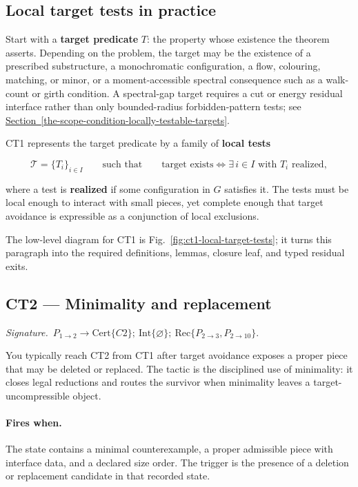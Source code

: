 \documentclass[
  11pt,
]{article}
\theoremstyle{definition}
\newcommand{\secref}[1]{\hyperref[#1]{Section~\ref*{#1}}}
\newcommand{\ctsignature}[1]{\par\noindent\emph{Signature.}\ #1\par\medskip}
\newcommand{\ctcert}[1]{\mathrm{Cert}\{#1\}}
\newcommand{\ctint}[1]{\mathrm{Int}\{#1\}}
\newcommand{\ctrec}[1]{\mathrm{Rec}\{#1\}}
\newcommand{\ctnone}{\varnothing}
\newcommand{\ctpar}[1]{\paragraph{#1.}}
\begin{document}
\subsection*{Local target tests in practice}

Start with a \textbf{target predicate} \(T\): the property whose
existence the theorem asserts. Depending on the problem, the target may
be the existence of a prescribed substructure, a monochromatic
configuration, a flow, colouring, matching, or minor, or a
moment-accessible spectral consequence such as a walk-count or girth
condition. A spectral-gap target requires a cut or energy residual
interface rather than only bounded-radius forbidden-pattern tests; see
\secref{the-scope-condition-locally-testable-targets}.

CT1 represents the target predicate by a family of
\textbf{local tests}

\[
\mathcal T = \{T_i\}_{i\in I}
\qquad\text{such that}\qquad
\text{target exists} \iff \exists\, i \in I \text{ with } T_i \text{ realized},
\]

where a test is \textbf{realized} if some configuration in \(G\)
satisfies it. The tests must be local enough to interact with small
pieces, yet complete enough that target avoidance is expressible as a
conjunction of local exclusions.

The low-level diagram for CT1 is Fig.~\ref{fig:ct1-local-target-tests};
it turns this paragraph into the required definitions, lemmas, closure
leaf, and typed residual exits.



\subsection{CT2 --- Minimality and replacement}\label{ct:2}\label{minimal-counterexample}
\ctsignature{\(P_{1\to2}\to \ctcert{C2};\ \ctint{\ctnone};\ \ctrec{P_{2\to3},P_{2\to10}}\).}

You typically reach CT2 from CT1 after target avoidance exposes a proper
piece that may be deleted or replaced.  The tactic is the disciplined use
of minimality: it closes legal reductions and routes the survivor when
minimality leaves a target-uncompressible object.

\ctpar{Fires when}
The state contains a minimal counterexample, a proper admissible piece
with interface data, and a declared size order.  The trigger is the
presence of a deletion or replacement candidate in that recorded state.
\end{document}
